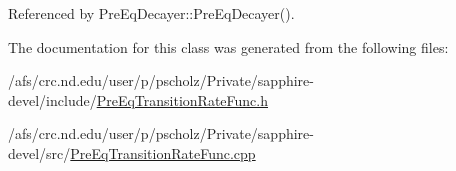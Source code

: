 Referenced by Pre\-Eq\-Decayer\-::\-Pre\-Eq\-Decayer().



The documentation for this class was generated from the following files\-:\begin{DoxyCompactItemize}
\item 
/afs/crc.\-nd.\-edu/user/p/pscholz/\-Private/sapphire-\/devel/include/\hyperlink{PreEqTransitionRateFunc_8h}{Pre\-Eq\-Transition\-Rate\-Func.\-h}\item 
/afs/crc.\-nd.\-edu/user/p/pscholz/\-Private/sapphire-\/devel/src/\hyperlink{PreEqTransitionRateFunc_8cpp}{Pre\-Eq\-Transition\-Rate\-Func.\-cpp}\end{DoxyCompactItemize}
